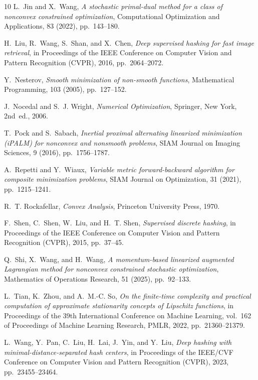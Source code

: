 \documentclass[11pt]{article}
\begin{document}
\begin{thebibliography}{10}
{\sc L.~Jin and X.~Wang}, {\em A stochastic primal-dual method for a class of
  nonconvex constrained optimization}, Computational Optimization and
  Applications, 83 (2022), pp.~143--180.

{\sc H.~Liu, R.~Wang, S.~Shan, and X.~Chen}, {\em Deep supervised hashing for
  fast image retrieval}, in Proceedings of the IEEE Conference on Computer
  Vision and Pattern Recognition (CVPR), 2016, pp.~2064--2072.

{\sc Y.~Nesterov}, {\em Smooth minimization of non-smooth functions},
  Mathematical Programming, 103 (2005), pp.~127--152.

{\sc J.~Nocedal and S.~J. Wright}, {\em Numerical Optimization}, Springer, New
  York, 2nd~ed., 2006.

{\sc T.~Pock and S.~Sabach}, {\em Inertial proximal alternating linearized
  minimization ({iPALM}) for nonconvex and nonsmooth problems}, SIAM Journal on
  Imaging Sciences, 9 (2016), pp.~1756--1787.

{\sc A.~Repetti and Y.~Wiaux}, {\em Variable metric forward-backward algorithm
  for composite minimization problems}, SIAM Journal on Optimization, 31
  (2021), pp.~1215--1241.

{\sc R.~T. Rockafellar}, {\em Convex Analysis}, Princeton University Press,
  1970.

{\sc F.~Shen, C.~Shen, W.~Liu, and H.~T. Shen}, {\em Supervised discrete
  hashing}, in Proceedings of the IEEE Conference on Computer Vision and
  Pattern Recognition (CVPR), 2015, pp.~37--45.

{\sc Q.~Shi, X.~Wang, and H.~Wang}, {\em A momentum-based linearized augmented
  {L}agrangian method for nonconvex constrained stochastic optimization},
  Mathematics of Operations Research, 51 (2025), pp.~92--133.

{\sc L.~Tian, K.~Zhou, and A.~M.-C. So}, {\em On the finite-time complexity and
  practical computation of approximate stationarity concepts of {Lipschitz}
  functions}, in Proceedings of the 39th International Conference on Machine
  Learning, vol.~162 of Proceedings of Machine Learning Research, PMLR, 2022,
  pp.~21360--21379.

{\sc L.~Wang, Y.~Pan, C.~Liu, H.~Lai, J.~Yin, and Y.~Liu}, {\em Deep hashing
  with minimal-distance-separated hash centers}, in Proceedings of the IEEE/CVF
  Conference on Computer Vision and Pattern Recognition (CVPR), 2023,
  pp.~23455--23464.


\end{thebibliography}
\end{document}
